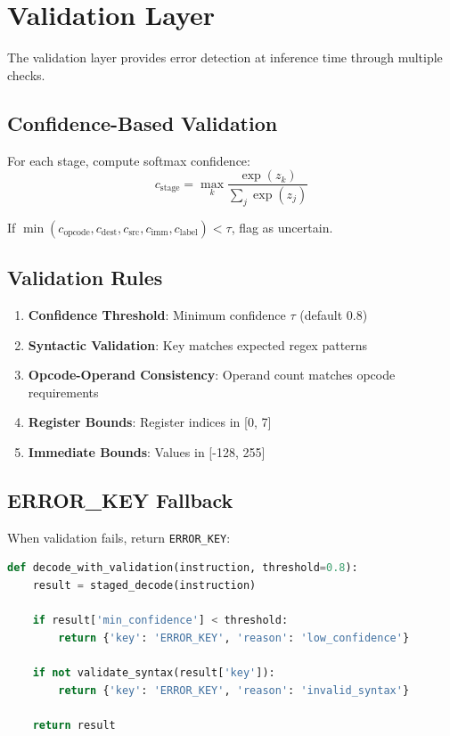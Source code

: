 \documentclass[11pt]{article}
\begin{document}
\section{Validation Layer}

The validation layer provides error detection at inference time through multiple checks.

\subsection{Confidence-Based Validation}

For each stage, compute softmax confidence:
\[
c_{\text{stage}} = \max_k \frac{\exp(z_k)}{\sum_j \exp(z_j)}
\]

If $\min(c_{\text{opcode}}, c_{\text{dest}}, c_{\text{src}}, c_{\text{imm}}, c_{\text{label}}) < \tau$, flag as uncertain.

\subsection{Validation Rules}

\begin{enumerate}
    \item \textbf{Confidence Threshold}: Minimum confidence $\tau$ (default 0.8)
    \item \textbf{Syntactic Validation}: Key matches expected regex patterns
    \item \textbf{Opcode-Operand Consistency}: Operand count matches opcode requirements
    \item \textbf{Register Bounds}: Register indices in [0, 7]
    \item \textbf{Immediate Bounds}: Values in [-128, 255]
\end{enumerate}

\subsection{ERROR\_KEY Fallback}

When validation fails, return \texttt{ERROR\_KEY}:

\begin{lstlisting}[language=Python]
def decode_with_validation(instruction, threshold=0.8):
    result = staged_decode(instruction)

    if result['min_confidence'] < threshold:
        return {'key': 'ERROR_KEY', 'reason': 'low_confidence'}

    if not validate_syntax(result['key']):
        return {'key': 'ERROR_KEY', 'reason': 'invalid_syntax'}

    return result
\end{lstlisting}
\end{document}
